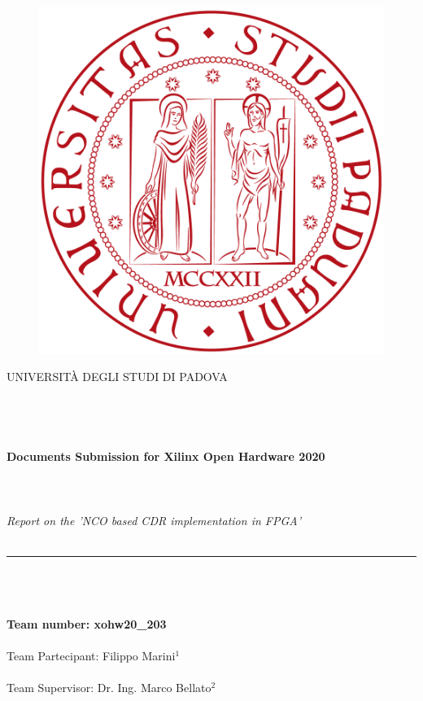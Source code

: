 \documentclass[12pt]{extarticle}
\renewcommand{\>}{\rangle} \renewcommand{\emptyset}{\varnothing}
\begin{document}
\begin{figure}[]
\end{figure}

\begin{figure}[]
  \centering \vspace{1cm}
  {\includegraphics[width=.15\textwidth]{images/Padova.png}}
\end{figure}
\begin{center}
  {\large{U}\normalsize{NIVERSITÀ DEGLI}\large{ S}\normalsize{TUDI DI}\large{ P}\normalsize{ADOVA}}\\
  \textit{ }\\
  \textit{ }\\
  \textit{ }\\
  \textit{ }\\
  \textbf{\large{Documents Submission for Xilinx Open Hardware 2020}}\\
  \textit{ }\\
  \textit{ }\\
  \textit{ }\\
  \textit{\Large{Report on the 'NCO based CDR implementation in FPGA'}} \\
  \textit{ }\\
  \noindent\rule{16cm}{0.4pt}
  \textit{ }\\
  \textit{ }\\
  \textit{ }\\
  \textbf{Team number: xohw20\_203}\\
  \textit{ }\\
  Team Partecipant: Filippo Marini$^1$\\
  \textit{ }\\
  Team Supervisor: Dr. Ing. Marco Bellato$^2$\\
  \textit{ }\\
\end{center}
\end{document}
